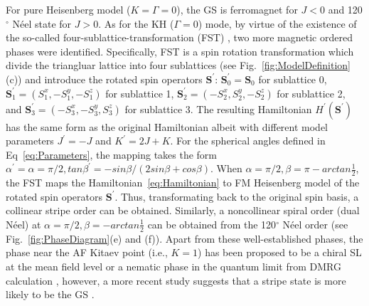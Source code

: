 \documentclass[aps,prb,reprint,amsfonts,amsmath,amssymb,showpacs,groupedaddress,superscriptaddress]{revtex4-1}
\begin{document}
For pure Heisenberg model ($K=\Gamma=0$), the GS is ferromagnet for $J<0$ and 120$^\circ$ N\'{e}el state for $J>0$. As for the KH ($\Gamma=0$) mode, by virtue of the existence of the so-called four-sublattice-transformation (FST) \cite{PhysRevB.89.014414}, two more magnetic ordered phases were identified. Specifically, FST is a spin rotation transformation which divide the triangluar lattice into four sublattices (see Fig.~\ref{fig:ModelDefinition}(c)) and introduce the rotated spin operators $\bm{S}^{'}$: $\bm{S}_{0}^{'} = \bm{S}_0$ for sublattice 0, $\bm{S}_{1}^{'} = (S_1^x, -S_1^y, -S_1^z)$ for sublattice 1, $\bm{S}_{2}^{'} = (-S_2^x, S_2^y, -S_2^z)$ for sublattice 2, and $\bm{S}_{3}^{'} = (-S_3^x, -S_3^y, S_3^z)$ for sublattice 3. The resulting Hamiltonian $H^{'}(\bm{S}^{'})$ has the same form as the original Hamiltonian albeit with different model parameters $J^{'} = -J$ and $K^{'} = 2J + K$. For the spherical angles defined in Eq~\eqref{eq:Parameters}, the mapping takes the form $\alpha^{'}=\alpha=\pi/2, tan\beta^{'}=-sin\beta/(2sin\beta + cos\beta)$. When $\alpha=\pi/2, \beta=\pi - arctan\frac{1}{2}$, the FST maps the Hamiltonian~\eqref{eq:Hamiltonian} to FM Heisenberg model of the rotated spin operators $\bm{S}^{'}$. Thus, transformating back to the original spin basis, a collinear stripe order can be obtained. Similarly, a noncollinear spiral order (dual N\'{e}el) at $\alpha=\pi/2, \beta=-arctan\frac{1}{2}$ can be obtained from the 120$^\circ$ N\'{e}el order (see Fig.~\ref{fig:PhaseDiagram}(e) and (f)). Apart from these well-established phases, the phase near the AF Kitaev point (i.e., $K=1$) has been proposed to be a chiral SL at the mean field level \cite{KaiLi2015} or a nematic phase in the quantum limit from DMRG calculation \cite{PhysRevB.91.155135}, however, a more recent study suggests that a stripe state is more likely to be the GS \cite{PhysRevX.9.021017}.
\end{document}
